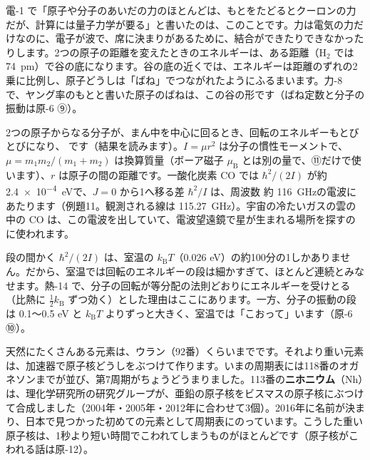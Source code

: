 電-1 で「原子や分子のあいだの力のほとんどは、もとをたどるとクーロンの力だが、計算には量子力学が要る」と書いたのは、このことです。力は電気の力だけなのに、電子が波で、席に決まりがあるために、結合ができたりできなかったりします。2つの原子の距離を変えたときのエネルギーは、ある距離（H$_2$ では \qty{74}{pm}）で谷の底になります。谷の底の近くでは、エネルギーは距離のずれの2乗に比例し、原子どうしは「ばね」でつながれたようにふるまいます。力-8 で、ヤング率のもとと書いた原子のばねは、この谷の形です（ばね定数と分子の振動は原-6 ⑨）。

2つの原子からなる分子が、まん中を中心に回るとき、回転のエネルギーもとびとびになり、
\label{ph:原-7:rot}です（結果を読みます）。$I=\mu r^2$ は分子の慣性モーメントで、$\mu=m_1m_2/(m_1+m_2)$ は換算質量（ボーア磁子 $\mu_{\mathrm B}$ とは別の量で、⑪だけで使います）、$r$ は原子の間の距離です。一酸化炭素 CO では $\hbar^2/(2I)$ が約 \qty{2.4e-4}{eV}で、$J=0$ から1へ移る差 $\hbar^2/I$ は、周波数 約 \qty{116}{GHz}の電波にあたります（例題11。観測される線は \qty{115.27}{GHz}）。宇宙の冷たいガスの雲の中の CO は、この電波を出していて、電波望遠鏡で星が生まれる場所を探すのに使われます。

段の間かく $\hbar^2/(2I)$ は、室温の $k_{\mathrm B}T$（0.026 eV）の約100分の1しかありません。だから、室温では回転のエネルギーの段は細かすぎて、ほとんど連続とみなせます。熱-14 で、分子の回転が等分配の法則どおりにエネルギーを受けとる（比熱に $\tfrac12k_{\mathrm B}$ ずつ効く）とした理由はここにあります。一方、分子の振動の段は 0.1〜0.5 eV と $k_{\mathrm B}T$ よりずっと大きく、室温では「こおって」います（原-6 ⑩）。

\label{ph:原-7:sec12}
天然にたくさんある元素は、ウラン（92番）くらいまでです。それより重い元素は、加速器で原子核どうしをぶつけて作ります。いまの周期表には118番のオガネソンまでが並び、第7周期がちょうどうまりました。113番の\textbf{ニホニウム}（Nh）は、理化学研究所の研究グループが、亜鉛の原子核をビスマスの原子核にぶつけて合成しました（2004年・2005年・2012年に合わせて3個）。2016年に名前が決まり、日本で見つかった初めての元素として周期表にのっています。こうした重い原子核は、1秒より短い時間でこわれてしまうものがほとんどです（原子核がこわれる話は原-12）。

\begin{phmodel}[電子1個の水素原子の解]
\end{phmodel}

